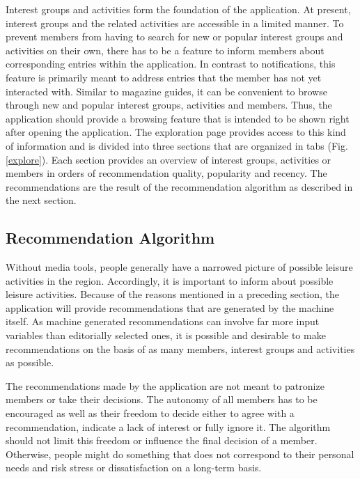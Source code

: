 \documentclass[12pt,numbers=noenddot,parskip,bibliography=totocnumbered,listof=totocnumbered,draft]{scrreprt}
\begin{document}
Interest groups and activities form the foundation of the application. At present, interest groups and the related activities are accessible in a limited manner. To prevent members from having to search for new or popular interest groups and activities on their own, there has to be a feature to inform members about corresponding entries within the application. In contrast to notifications, this feature is primarily meant to address entries that the member has not yet interacted with. Similar to magazine guides, it can be convenient to browse through new and popular interest groups, activities and members. Thus, the application should provide a browsing feature that is intended to be shown right after opening the application. The exploration page provides access to this kind of information and is divided into three sections that are organized in tabs (Fig. \ref{explore}). Each section provides an overview of interest groups, activities or members in orders of recommendation quality, popularity and recency. The recommendations are the result of the recommendation algorithm as described in the next section.

\subsection{Recommendation Algorithm}
Without media tools, people generally have a narrowed picture of possible leisure activities in the region. Accordingly, it is important to inform about possible leisure activities. Because of the reasons mentioned in a preceding section, the application will provide recommendations that are generated by the machine itself. As machine generated recommendations can involve far more input variables than editorially selected ones, it is possible and desirable to make recommendations on the basis of as many members, interest groups and activities as possible.

The recommendations made by the application are not meant to patronize members or take their decisions. The autonomy of all members has to be encouraged as well as their freedom to decide either to agree with a recommendation, indicate a lack of interest or fully ignore it. The algorithm should not limit this freedom or influence the final decision of a member. Otherwise, people might do something that does not correspond to their personal needs and risk stress or dissatisfaction on a long-term basis.
\end{document}

